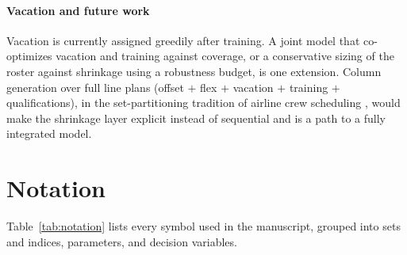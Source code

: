 \documentclass[preprint,12pt]{elsarticle}
\begin{document}
   \paragraph{Vacation and future work} Vacation is currently assigned greedily after training. A joint model that co-optimizes vacation and training against coverage, or a conservative sizing of the roster against shrinkage using a robustness budget, is one extension. Column generation over full line plans (offset $+$ flex $+$ vacation $+$ training $+$ qualifications), in the set-partitioning tradition of airline crew scheduling \cite{dantzig1960decomposition,vance1997airline,desaulniers2005column}, would make the shrinkage layer explicit instead of sequential and is a path to a fully integrated model.





\newpage
\appendix
\section{Notation}\label{app:notation}
   Table~\ref{tab:notation} lists every symbol used in the manuscript, grouped into sets and indices, parameters, and decision variables.
\end{document}
